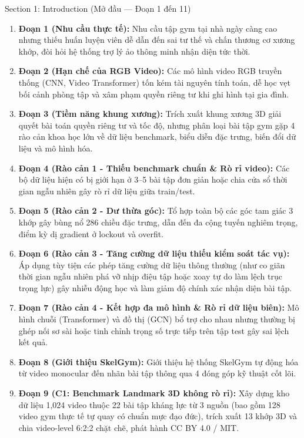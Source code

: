\documentclass[10pt,a4paper]{article}
\begin{document}
\begin{secbox}{Section 1: Introduction (Mở đầu — Đoạn 1 đến 11)}
\begin{enumerate}[leftmargin=*, itemsep=2pt, topsep=1pt]
    \item \textbf{Đoạn 1 (Nhu cầu thực tế):} Nhu cầu tập gym tại nhà ngày càng cao nhưng thiếu huấn luyện viên dễ dẫn đến sai tư thế và chấn thương cơ xương khớp, đòi hỏi hệ thống trợ lý ảo thông minh nhận diện tức thời.
    \item \textbf{Đoạn 2 (Hạn chế của RGB Video):} Các mô hình video RGB truyền thống (CNN, Video Transformer) tốn kém tài nguyên tính toán, dễ học vẹt bối cảnh phòng tập và xâm phạm quyền riêng tư khi ghi hình tại gia đình.
    \item \textbf{Đoạn 3 (Tiềm năng khung xương):} Trích xuất khung xương 3D giải quyết bài toán quyền riêng tư và tốc độ, nhưng phân loại bài tập gym gặp 4 rào cản khoa học lớn về dữ liệu benchmark, biểu diễn đặc trưng, biến đổi dữ liệu và mô hình hóa.
    \item \textbf{Đoạn 4 (Rào cản 1 - Thiếu benchmark chuẩn \& Rò rỉ video):} Các bộ dữ liệu hiện có bị giới hạn ở 3--5 bài tập đơn giản hoặc chia cửa sổ thời gian ngẫu nhiên gây rò rỉ dữ liệu giữa train/test.
    \item \textbf{Đoạn 5 (Rào cản 2 - Dư thừa góc):} Tổ hợp toàn bộ các góc tam giác 3 khớp gây bùng nổ 286 chiều đặc trưng, dẫn đến đa cộng tuyến nghiêm trọng, điểm kỳ dị gradient ở lockout và overfit.
    \item \textbf{Đoạn 6 (Rào cản 3 - Tăng cường dữ liệu thiếu kiểm soát tác vụ):} Áp dụng tùy tiện các phép tăng cường dữ liệu thông thường (như co giãn thời gian ngẫu nhiên phá vỡ nhịp điệu tập hoặc xoay tự do làm lệch trục trọng lực) gây nhiễu động học và làm giảm độ chính xác nhận diện bài tập.
    \item \textbf{Đoạn 7 (Rào cản 4 - Kết hợp đa mô hình \& Rò rỉ dữ liệu biên):} Mô hình chuỗi (Transformer) và đồ thị (GCN) bổ trợ cho nhau nhưng thường bị ghép nối sơ sài hoặc tinh chỉnh trọng số trực tiếp trên tập test gây sai lệch kết quả.
    \item \textbf{Đoạn 8 (Giới thiệu SkelGym):} Giới thiệu hệ thống SkelGym tự động hóa từ video monocular đến nhãn bài tập thông qua 4 đóng góp kỹ thuật cốt lõi.
    \item \textbf{Đoạn 9 (C1: Benchmark Landmark 3D không rò rỉ):} Xây dựng kho dữ liệu 1,024 video thuộc 22 bài tập kháng lực từ 3 nguồn (bao gồm 128 video gym thực tế tự quay có chuẩn mực đạo đức), trích xuất 13 khớp 3D và chia video-level 6:2:2 chặt chẽ, phát hành CC BY 4.0 / MIT.

\end{enumerate}
\end{secbox}
\end{document}

